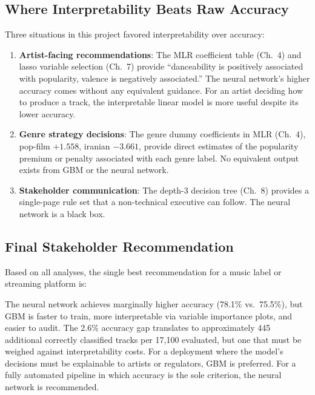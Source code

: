 \documentclass[12pt, oneside]{book}
\begin{document}
\subsection{Where Interpretability Beats Raw Accuracy}
 
Three situations in this project favored interpretability over accuracy:
 
\begin{enumerate}
    \item \textbf{Artist-facing recommendations}: The MLR coefficient table (Ch.\ 4) and lasso variable selection (Ch.\ 7) provide ``danceability is positively associated with popularity, valence is negatively associated.'' The neural network's higher accuracy comes without any equivalent guidance. For an artist deciding how to produce a track, the interpretable linear model is more useful despite its lower accuracy.
 
    \item \textbf{Genre strategy decisions}: The genre dummy coefficients in MLR (Ch.\ 4), pop-film $+1.558$, iranian $-3.661$, provide direct estimates of the popularity premium or penalty associated with each genre label. No equivalent output exists from GBM or the neural network.
 
    \item \textbf{Stakeholder communication}: The depth-3 decision tree (Ch.\ 8) provides a single-page rule set that a non-technical executive can follow. The neural network is a black box.
\end{enumerate}
 
\subsection{Final Stakeholder Recommendation}
 
Based on all analyses, the single best recommendation for a music label or streaming platform is:
 
The neural network achieves marginally higher accuracy (78.1\% vs.\ 75.5\%), but GBM is faster to train, more interpretable via variable importance plots, and easier to audit. The 2.6\% accuracy gap translates to approximately 445 additional correctly classified tracks per 17{,}100 evaluated, but one that must be weighed against interpretability costs. For a deployment where the model's decisions must be explainable to artists or regulators, GBM is preferred. For a fully automated pipeline in which accuracy is the sole criterion, the neural network is recommended.
 
\end{document}

